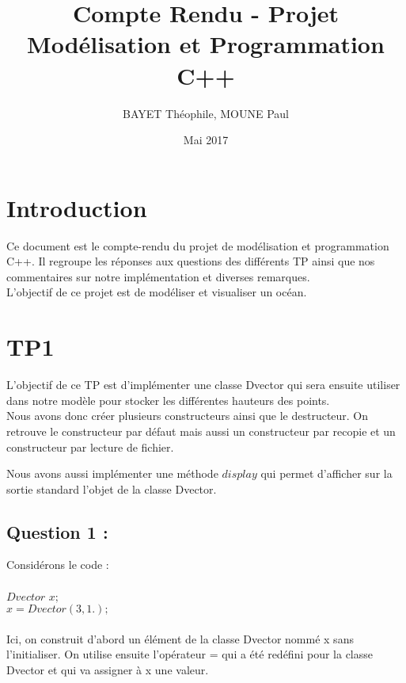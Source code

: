 \documentclass{article}
\title{Compte Rendu - Projet Modélisation et Programmation C++}
\author{BAYET Théophile, MOUNE Paul}
\date{Mai 2017}
\begin{document}
\maketitle

\vspace{1.5cm}

\section{Introduction}

Ce document est le compte-rendu du projet de modélisation et programmation C++. Il regroupe les réponses aux questions des
différents TP ainsi que nos commentaires sur notre implémentation et diverses remarques. \\
L'objectif de ce projet est de modéliser et visualiser un océan.

\vspace{1cm}

\section{TP1}

L'objectif de ce TP est d'implémenter une classe Dvector qui sera ensuite utiliser dans notre modèle pour stocker les différentes hauteurs des points. \\

Nous avons donc créer plusieurs constructeurs ainsi que le destructeur. On retrouve le constructeur par défaut mais aussi un constructeur par recopie et un constructeur par lecture de fichier.

Nous avons aussi implémenter une méthode $display$ qui permet d'afficher sur la sortie standard l'objet de la classe Dvector.

\vspace{0.5cm}
\subsection{Question 1 :}

Considérons le code : \\ \\ $Dvector$ $x;$ \\ $x = Dvector(3, 1.);$ \\ \\

Ici, on construit d'abord un élément de la classe Dvector nommé x sans l'initialiser.
On utilise ensuite l'opérateur = qui a été redéfini pour la classe Dvector et qui va assigner à x une valeur.
\end{document}
